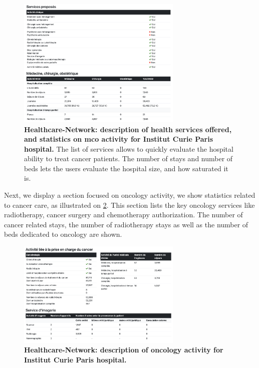 \begin{figure}[h]
    \includegraphics[width=0.7\textwidth]{images/healthcare-network/curie-services.png}
    \centering
    \caption{ \textbf{Healthcare-Network: description of health services
            offered, and statistics on \ac{mco} activity for Institut Curie Paris
            hospital.} The list of services allows to quickly evaluate the
        hospital ability to treat cancer patients. The number of stays and number of
        beds lets the users evaluate the hospital size, and how saturated it is.}
    \label{fig:hn-curie-services}
\end{figure}

Next, we display a section focused on oncology activity, we show statistics
related to cancer care, as illustrated on \cref{fig:hn-curie-cancero}. This
section lists the key oncology services like radiotherapy, cancer surgery and
chemotherapy authorization. The number of cancer related stays, the number of
radiotherapy stays as well as the number of beds dedicated to oncology are
shown.

\begin{figure}[h]
    \includegraphics[width=0.7\textwidth]{images/healthcare-network/curie-cancero.png}
    \centering
    \caption{
        \textbf{Healthcare-Network: description of oncology activity for Institut Curie Paris hospital.}
    }
    \label{fig:hn-curie-cancero}
\end{figure}

